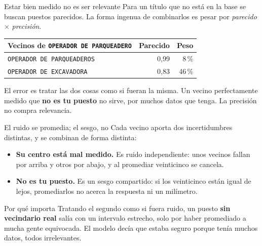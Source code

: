 \documentclass[11pt]{beamer}
\begin{document}
\begin{frame}{Estar bien medido no es ser relevante}
Para un título que no está en la base se buscan puestos parecidos. La forma
ingenua de combinarlos es pesar por \emph{parecido} $\times$ \emph{precisión}.
\vspace{0.6em}
\begin{table}
\centering
\small
\begin{tabular}{lrr}
\toprule
Vecinos de \texttt{OPERADOR DE PARQUEADERO} & Parecido & Peso \\
\midrule
\texttt{OPERADOR DE PARQUEADEROS} & 0,99 & 8\,\% \\
\texttt{OPERADOR DE EXCAVADORA} & 0,83 & \alert{46\,\%} \\
\bottomrule
\end{tabular}
\end{table}
\vspace{0.6em}
El error es tratar las dos cosas como si fueran la misma. Un vecino
perfectamente medido que \textbf{no es tu puesto} no sirve, por muchos datos que
tenga. La precisión no compra relevancia.
\end{frame}

\begin{frame}{El ruido se promedia; el sesgo, no}
Cada vecino aporta dos incertidumbres distintas, y se combinan de forma
distinta:
\vspace{0.8em}
\begin{itemize}
\item \textbf{Su centro está mal medido.} Es ruido independiente: unos vecinos
fallan por arriba y otros por abajo, y al promediar veinticinco se cancela.
\item \textbf{No es tu puesto.} Es un \alert{sesgo compartido}: si los
veinticinco están igual de lejos, promediarlos no acerca la respuesta ni un
milímetro.
\end{itemize}
\vspace{0.8em}
\begin{block}{Por qué importa}
Tratando el segundo como si fuera ruido, un puesto \textbf{sin vecindario real}
salía con un intervalo estrecho, solo por haber promediado a mucha gente
equivocada. El modelo decía que estaba seguro porque tenía muchos datos, todos
irrelevantes.
\end{block}
\end{frame}
\end{document}

